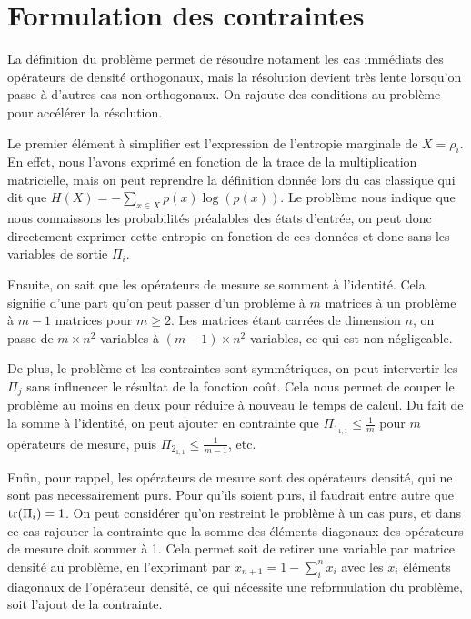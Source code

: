 \medbreak

\section{Formulation des contraintes}

La définition du problème permet de résoudre notament les cas immédiats des opérateurs de densité orthogonaux, mais la résolution devient très lente lorsqu'on passe à d'autres cas non orthogonaux. On rajoute des conditions au problème pour accélérer la résolution.

Le premier élément à simplifier est l'expression de l'entropie marginale de $X=\rho_i$. En effet, nous l'avons exprimé en fonction de la trace de la multiplication matricielle, mais on peut reprendre la définition donnée lors du cas classique qui dit que $ H(X) = -\displaystyle \sum_{x \in X} p(x) \log(p(x))$. Le problème nous indique que nous connaissons les probabilités préalables des états d'entrée, on peut donc directement exprimer cette entropie en fonction de ces données et donc sans les variables de sortie $\Pi_i$.

Ensuite, on sait que les opérateurs de mesure se somment à l'identité. Cela signifie d'une part qu'on peut passer d'un problème à $m$ matrices à un problème à $m-1$ matrices pour $m \geq 2$. Les matrices étant carrées de dimension $n$, on passe de $m \times n^2$ variables à $(m - 1) \times n^2$ variables, ce qui est non négligeable.

De plus, le problème et les contraintes sont symmétriques, on peut intervertir les $\Pi_j$ sans influencer le résultat de la fonction coût. Cela nous permet de couper le problème au moins en deux pour réduire à nouveau le temps de calcul. Du fait de la somme à l'identité, on peut ajouter en contrainte que $\Pi_{1_{1, 1}} \leq \frac{1}{m}$ pour $m$ opérateurs de mesure, puis $\Pi_{2_{1, 1}} \leq \frac{1}{m-1}$, etc.

Enfin, pour rappel, les opérateurs de mesure sont des opérateurs densité, qui ne sont pas necessairement purs. Pour qu'ils soient purs, il faudrait entre autre que $\operatorname{tr}(\Pi_i) = 1$. On peut considérer qu'on restreint le problème à un cas purs, et dans ce cas rajouter la contrainte que la somme des éléments diagonaux des opérateurs de mesure doit sommer à 1. Cela permet soit de retirer une variable par matrice densité au problème, en l'exprimant par $x_{n+1} = 1 - \displaystyle \sum_{i}^{n} x_i$ avec les $x_i$ éléments diagonaux de l'opérateur densité, ce qui nécessite une reformulation du problème, soit l'ajout de la contrainte.

